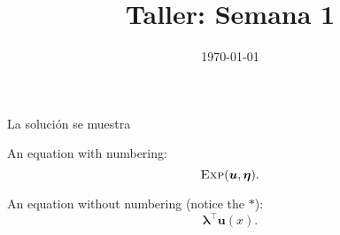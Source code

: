 \documentclass[a4paper]{article}
\date{\today}
\title{Taller: Semana 1}
\newcommand{\T}{\top}
\newcommand{\expdist}[2]{%
        \normalfont{\textsc{Exp}}(#1, #2)%
    }
\newcommand{\expparam}{\bm \lambda}
\newcommand{\natparam}{\bm \eta}
\newcommand{\sufstat}{\bm u}
\begin{document}
    \header{}

    \begin{answer}[Problema 1.]
        La solución se muestra 

        An equation with numbering:
        \begin{equation}
            \expdist{\sufstat}{\natparam}.
        \end{equation}

        An equation without numbering (notice the $*$):
        \begin{equation*}
            \expparam^{\T} \sufstat(x).
        \end{equation*}
    \end{answer}
\end{document}
